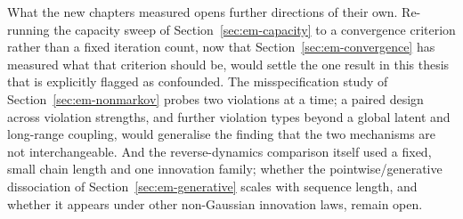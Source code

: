 What the new chapters measured opens further directions of their own.
Re-running the capacity sweep of Section~\ref{sec:em-capacity} to a
convergence criterion rather than a fixed iteration count, now that
Section~\ref{sec:em-convergence} has measured what that criterion should be,
would settle the one result in this thesis that is explicitly flagged as
confounded. The misspecification study of Section~\ref{sec:em-nonmarkov}
probes two violations at a time; a paired design across violation strengths,
and further violation types beyond a global latent and long-range coupling,
would generalise the finding that the two mechanisms are not
interchangeable. And the reverse-dynamics comparison itself used a fixed,
small chain length and one innovation family; whether the pointwise/generative
dissociation of Section~\ref{sec:em-generative} scales with sequence length,
and whether it appears under other non-Gaussian innovation laws, remain
open.
